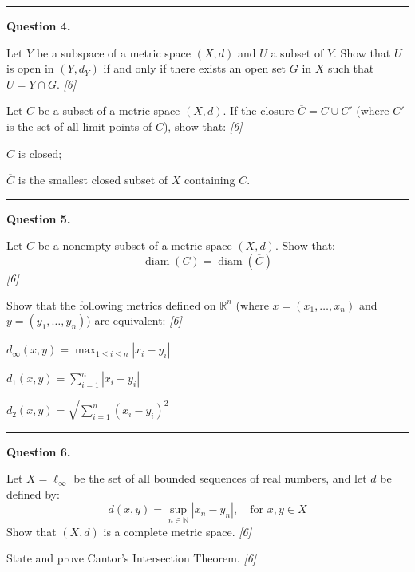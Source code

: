 \documentclass[11pt,a4paper]{article}
\newcommand{\pts}[1]{\hfill   \textit{[#1]}}
\begin{document}
\medskip\rule{\linewidth}{0.2pt}

\medskip


\noindent   \textbf{Question 4.}

\begin{parts}
  \item Let $Y$ be a subspace of a metric space $(X, d)$ and $U$ a subset of $Y$. Show that $U$ is open in $(Y, d_Y)$ if and only if there exists an open set $G$ in $X$ such that $U = Y \cap G$. \pts{6}
  \item Let $C$ be a subset of a metric space $(X, d)$. If the closure $\overline{C} = C \cup C'$ (where $C'$ is the set of all limit points of $C$), show that: \pts{6}
  
\begin{parts}
    \item $\overline{C}$ is closed;
    \item $\overline{C}$ is the smallest closed subset of $X$ containing $C$.
  \end{parts}
\end{parts}

\medskip\rule{\linewidth}{0.2pt}

\medskip


\noindent   \textbf{Question 5.}

\begin{parts}
  \item Let $C$ be a nonempty subset of a metric space $(X, d)$. Show that:
  \[ \operatorname{diam}(C) = \operatorname{diam}(\overline{C}) \] \pts{6}
  \item Show that the following metrics defined on $\mathbb{R}^n$ (where $x = (x_1, \dots, x_n)$ and $y = (y_1, \dots, y_n)$) are equivalent: \pts{6}
  
\begin{parts}
    \item $d_\infty(x, y) = \max_{1 \le i \le n} |x_i - y_i|$
    \item $d_1(x, y) = \sum_{i=1}^n |x_i - y_i|$
    \item $d_2(x, y) = \sqrt{\sum_{i=1}^n (x_i - y_i)^2}$
  \end{parts}
\end{parts}

\medskip\rule{\linewidth}{0.2pt}

\medskip


\noindent   \textbf{Question 6.}

\begin{parts}
  \item Let $X = \ell_\infty$ be the set of all bounded sequences of real numbers, and let $d$ be defined by:
  \[ d(x, y) = \sup_{n \in \mathbb{N}} |x_n - y_n|, \quad  \text{for } x, y \in X \]
  Show that $(X, d)$ is a complete metric space. \pts{6}
  \item State and prove Cantor's Intersection Theorem. \pts{6}
\end{parts}
\end{document}
